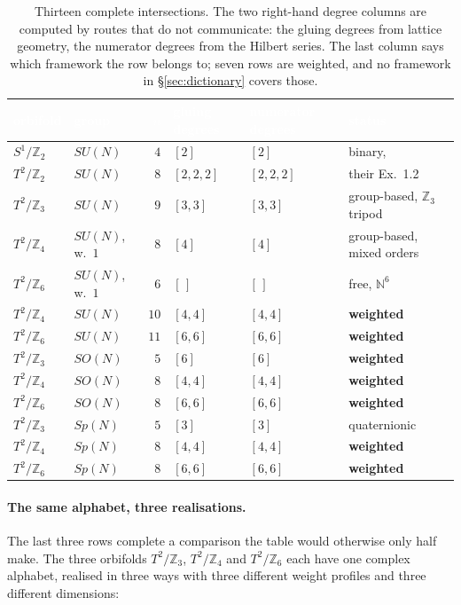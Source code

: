 \documentclass[11pt,a4paper]{article}
\theoremstyle{definition}
\newcommand{\ZZ}{\mathbb{Z}}
\newcommand{\NN}{\mathbb{N}}
\newcommand{\su}[1]{SU(#1)}
\newcommand{\so}[1]{SO(#1)}
\newcommand{\sy}[1]{Sp(#1)}
\begin{document}
\begin{table}[h]
\centering\small
\begin{tabular}{llrlll}
\toprule
\rowcolor{hdrblue}
\textcolor{white}{orbifold} & \textcolor{white}{group} & \textcolor{white}{$n$} &
\textcolor{white}{gluing degrees} & \textcolor{white}{numerator degrees} &
\textcolor{white}{status}\\
\midrule
$S^1/\ZZ_2$ & $\su N$ & $4$ & $[2]$ & $[2]$ & binary, \cite{SScuts}\\
\rowcolor{softgrey}
$T^2/\ZZ_2$ & $\su N$ & $8$ & $[2,2,2]$ & $[2,2,2]$ & their Ex.~1.2\\
$T^2/\ZZ_3$ & $\su N$ & $9$ & $[3,3]$ & $[3,3]$ & group-based, $\ZZ_3$ tripod\\
\rowcolor{softgrey}
$T^2/\ZZ_4$ & $\su N$, w.\ $1$ & $8$ & $[4]$ & $[4]$ & group-based, mixed orders\\
$T^2/\ZZ_6$ & $\su N$, w.\ $1$ & $6$ & $[\,]$ & $[\,]$ & free, $\NN^6$\\
\rowcolor{softgrey}
$T^2/\ZZ_4$ & $\su N$ & $10$ & $[4,4]$ & $[4,4]$ & \textbf{weighted}\\
$T^2/\ZZ_6$ & $\su N$ & $11$ & $[6,6]$ & $[6,6]$ & \textbf{weighted}\\
\rowcolor{softgrey}
$T^2/\ZZ_3$ & $\so N$ & $5$ & $[6]$ & $[6]$ & \textbf{weighted}\\
$T^2/\ZZ_4$ & $\so N$ & $8$ & $[4,4]$ & $[4,4]$ & \textbf{weighted}\\
\rowcolor{softgrey}
$T^2/\ZZ_6$ & $\so N$ & $8$ & $[6,6]$ & $[6,6]$ & \textbf{weighted}\\
\midrule
\rowcolor{softgrey}
$T^2/\ZZ_3$ & $\sy N$ & $5$ & $[3]$ & $[3]$ & quaternionic\\
$T^2/\ZZ_4$ & $\sy N$ & $8$ & $[4,4]$ & $[4,4]$ & \textbf{weighted}\\
\rowcolor{softgrey}
$T^2/\ZZ_6$ & $\sy N$ & $8$ & $[6,6]$ & $[6,6]$ & \textbf{weighted}\\
\bottomrule
\end{tabular}
\caption{Thirteen complete intersections. The two right-hand degree columns are computed by routes
that do not communicate: the gluing degrees from lattice geometry, the numerator degrees from the
Hilbert series. The last column says which framework the row belongs to; seven rows are weighted,
and no framework in \S\ref{sec:dictionary} covers those.}
\label{tab:gluings}
\end{table}

\paragraph{The same alphabet, three realisations.} The last three rows complete a comparison the
table would otherwise only half make. The three orbifolds $T^2/\ZZ_3$, $T^2/\ZZ_4$ and $T^2/\ZZ_6$
each have one complex alphabet, realised in three ways with three different weight profiles and
three different dimensions:
\end{document}
